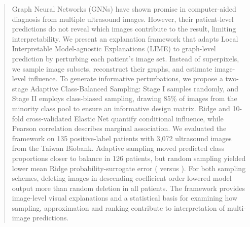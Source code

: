 \begin{abstract}
Graph Neural Networks (GNNs) have shown promise in computer-aided diagnosis from multiple ultrasound images. However, their patient-level predictions do not reveal which images contribute to the result, limiting interpretability. We present an explanation framework that adapts Local Interpretable Model-agnostic Explanations (LIME) to graph-level prediction by perturbing each patient’s image set. Instead of superpixels, we sample image subsets, reconstruct their graphs, and estimate image-level influence. To generate informative perturbations, we propose a two-stage Adaptive Class-Balanced Sampling: Stage I samples randomly, and Stage II employs class-biased sampling, drawing 85\% of images from the minority class pool to ensure an informative design matrix. Ridge and 10-fold cross-validated Elastic Net quantify conditional influence, while Pearson correlation describes marginal association. We evaluated the framework on 135 positive-label patients with 3,072 ultrasound images from the Taiwan Biobank. Adaptive sampling moved predicted class proportions closer to balance in 126 patients, but random sampling yielded lower mean Ridge probability-surrogate error (\RandomMAE{} versus \AdaptiveMAE{}). For both sampling schemes, deleting images in descending coefficient order lowered model output more than random deletion in all patients. The framework provides image-level visual explanations and a statistical basis for examining how sampling, approximation and ranking contribute to interpretation of multi-image predictions.
\end{abstract}
